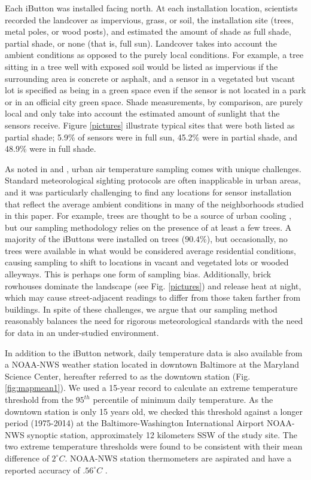  Each iButton was installed facing north. At each installation location, scientists recorded the landcover as impervious, grass, or soil, the installation site (trees, metal poles, or wood posts), and estimated the amount of shade as full shade, partial shade, or none (that is, full sun). Landcover takes into account the ambient conditions as opposed to the purely local conditions. For example, a tree sitting in a tree well with exposed soil would be listed as impervious if the surrounding area is concrete or asphalt, and a sensor in a vegetated but vacant lot is specified as being in a green space even if the sensor is not located in a park or in an official city green space. Shade measurements, by comparison, are purely local and only take into account the estimated amount of sunlight that the sensors receive. Figure \ref{pictures} illustrate typical sites that were both listed as partial shade; 5.9\% of sensors were in full sun, 45.2\% were in partial shade, and 48.9\% were in full shade. 

As noted in \cite{Chapman:2015aa} and \cite{wmoguide}, urban air temperature sampling comes with unique challenges. Standard meteorological sighting protocols are often inapplicable in urban areas, and it was particularly challenging to find any locations for sensor installation that reflect the average ambient conditions in many of the neighborhoods studied in this paper. For example, trees are thought to be a source of urban cooling \citep{kleerekoper2012}, but our sampling methodology relies on the presence of at least a few trees. A majority of the iButtons were installed on trees ($90.4\%$), but occasionally, no trees were available in what would be considered average residential conditions, causing sampling to shift to locations in vacant and vegetated lots or wooded alleyways. This is perhaps one form of sampling bias. 
Additionally, brick rowhouses dominate the landscape (see Fig. \ref{pictures}) and release heat at night, which may cause street-adjacent readings to differ from those taken farther from buildings. In spite of these challenges, we argue that our sampling method reasonably balances the need for rigorous meteorological standards with the need for data in an under-studied environment.

In addition to the iButton network, daily temperature data is also available from a NOAA-NWS weather station located in downtown Baltimore at the Maryland Science Center, hereafter referred to as the downtown station (Fig. \ref{fig:mapmean1}). We used a 15-year record to calculate an extreme temperature threshold from the $95^{th}$ percentile of minimum daily temperature. As the downtown station is only 15 years old, we checked this threshold against a longer period (1975-2014) at the Baltimore-Washington International Airport NOAA-NWS synoptic station, approximately 12 kilometers SSW of the study site. The two extreme temperature thresholds were found to be consistent with their mean difference of $2^{\circ} C$. NOAA-NWS station thermometers are aspirated and have a reported accuracy of $.56^{\circ} C $ \citep{nwsdata}.

